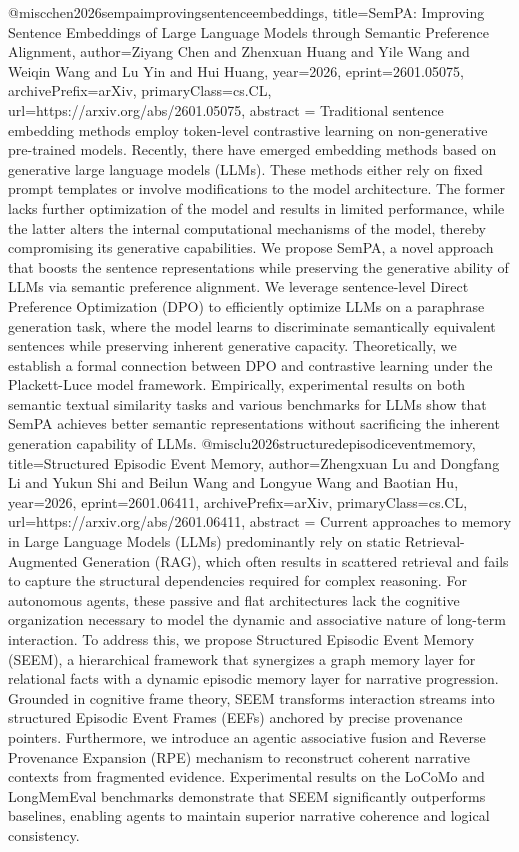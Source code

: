 {}@misc{chen2026sempaimprovingsentenceembeddings,
      title={SemPA: Improving Sentence Embeddings of Large Language Models through Semantic Preference Alignment}, 
      author={Ziyang Chen and Zhenxuan Huang and Yile Wang and Weiqin Wang and Lu Yin and Hui Huang},
      year={2026},
      eprint={2601.05075},
      archivePrefix={arXiv},
      primaryClass={cs.CL},
      url={https://arxiv.org/abs/2601.05075},
      abstract = {Traditional sentence embedding methods employ token-level contrastive learning on non-generative pre-trained models. Recently, there have emerged embedding methods based on generative large language models (LLMs). These methods either rely on fixed prompt templates or involve modifications to the model architecture. The former lacks further optimization of the model and results in limited performance, while the latter alters the internal computational mechanisms of the model, thereby compromising its generative capabilities. We propose SemPA, a novel approach that boosts the sentence representations while preserving the generative ability of LLMs via semantic preference alignment. We leverage sentence-level Direct Preference Optimization (DPO) to efficiently optimize LLMs on a paraphrase generation task, where the model learns to discriminate semantically equivalent sentences while preserving inherent generative capacity. Theoretically, we establish a formal connection between DPO and contrastive learning under the Plackett-Luce model framework. Empirically, experimental results on both semantic textual similarity tasks and various benchmarks for LLMs show that SemPA achieves better semantic representations without sacrificing the inherent generation capability of LLMs.}
}@misc{lu2026structuredepisodiceventmemory,
      title={Structured Episodic Event Memory}, 
      author={Zhengxuan Lu and Dongfang Li and Yukun Shi and Beilun Wang and Longyue Wang and Baotian Hu},
      year={2026},
      eprint={2601.06411},
      archivePrefix={arXiv},
      primaryClass={cs.CL},
      url={https://arxiv.org/abs/2601.06411},
      abstract = {Current approaches to memory in Large Language Models (LLMs) predominantly rely on static Retrieval-Augmented Generation (RAG), which often results in scattered retrieval and fails to capture the structural dependencies required for complex reasoning. For autonomous agents, these passive and flat architectures lack the cognitive organization necessary to model the dynamic and associative nature of long-term interaction. To address this, we propose Structured Episodic Event Memory (SEEM), a hierarchical framework that synergizes a graph memory layer for relational facts with a dynamic episodic memory layer for narrative progression. Grounded in cognitive frame theory, SEEM transforms interaction streams into structured Episodic Event Frames (EEFs) anchored by precise provenance pointers. Furthermore, we introduce an agentic associative fusion and Reverse Provenance Expansion (RPE) mechanism to reconstruct coherent narrative contexts from fragmented evidence. Experimental results on the LoCoMo and LongMemEval benchmarks demonstrate that SEEM significantly outperforms baselines, enabling agents to maintain superior narrative coherence and logical consistency.}
}

